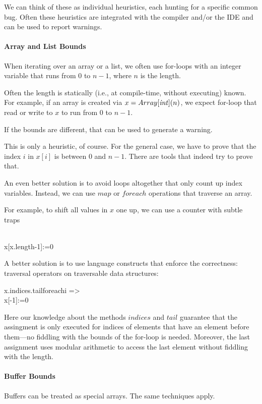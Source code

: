 We can think of these as individual heuristics, each hunting for a specific common bug.
Often these heuristics are integrated with the compiler and/or the IDE and can be used to report warnings.

\paragraph{Array and List Bounds}
When iterating over an array or a list, we often use for-loops with an integer variable that runs from $0$ to $n-1$, where $n$ is the length.

Often the length is statically (i.e., at compile-time, without executing) known.
For example, if an array is created via $x=Array[\mathit{int}](n)$, we expect for-loop that read or write to $x$ to run from $0$ to $n-1$.

If the bounds are different, that can be used to generate a warning.

This is only a heuristic, of course.
For the general case, we have to prove that the index $i$ in $x[i]$ is between $0$ and $n-1$.
There are tools that indeed try to prove that.
\medskip

An even better solution is to avoid loops altogether that only count up index variables.
Instead, we can use $map$ or $foreach$ operations that traverse an array.

For example, to shift all values in $x$ one up, we can use a counter with subtle traps 
\begin{acode}
\\
x[x.length-1]:=0
\end{acode}

A better solution is to use language constructs that enforce the correctness: traversal operators on traversable data structures:
\begin{acode}
x.indices.tail\;foreach\;i =>\\
x[-1]:=0
\end{acode}
Here our knowledge about the methods $indices$ and $tail$ guarantee that the assingment is only executed for indices of elements that have an element before them---no fiddling with the bounds of the for-loop is needed.
Moreover, the last assignment uses modular arithmetic to access the last element without fiddling with the length.

\paragraph{Buffer Bounds}
Buffers can be treated as special arrays.
The same techniques apply.

